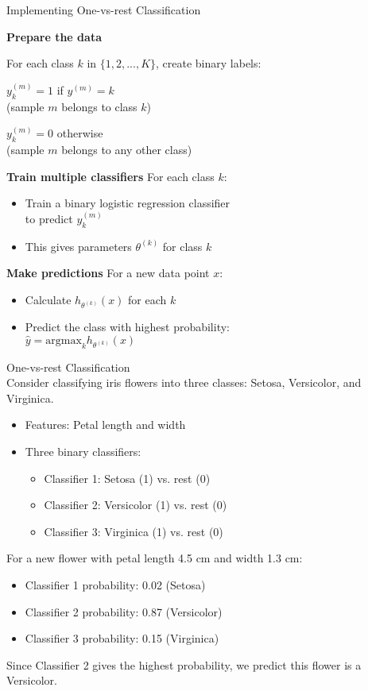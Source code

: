 
\begin{KR}{Implementing One-vs-rest Classification}

\textbf{Prepare the data}

For each class $k$ in $\{1, 2, ..., K\}$, create binary labels:

$y^{(m)}_k = 1$ if $y^{(m)} = k$ \\(sample $m$ belongs to class $k$)

$y^{(m)}_k = 0$ otherwise\\ (sample $m$ belongs to any other class)


\textbf{Train multiple classifiers}
For each class $k$:
\begin{itemize}
    \item Train a binary logistic regression classifier \\to predict $y^{(m)}_k$
    \item This gives parameters $\theta^{(k)}$ for class $k$
\end{itemize}

\textbf{Make predictions}
For a new data point $x$:
\begin{itemize}
    \item Calculate $h_{\theta^{(k)}}(x)$ for each $k$
    \item Predict the class with highest probability: \\$\hat{y} = \text{argmax}_k h_{\theta^{(k)}}(x)$
\end{itemize}
\end{KR}

\begin{example2}{One-vs-rest Classification}\\
Consider classifying iris flowers into three classes: Setosa, Versicolor, and Virginica.
\begin{itemize}
    \item Features: Petal length and width
    \item Three binary classifiers:
    \begin{itemize}
        \item Classifier 1: Setosa (1) vs. rest (0)
        \item Classifier 2: Versicolor (1) vs. rest (0)
        \item Classifier 3: Virginica (1) vs. rest (0)
    \end{itemize}
\end{itemize}
\tcblower
For a new flower with petal length 4.5 cm and width 1.3 cm:
\begin{itemize}
    \item Classifier 1 probability: 0.02 (Setosa)
    \item Classifier 2 probability: 0.87 (Versicolor)
    \item Classifier 3 probability: 0.15 (Virginica)
\end{itemize}
Since Classifier 2 gives the highest probability, we predict this flower is a Versicolor.
\end{example2}

